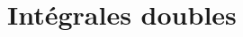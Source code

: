 \documentclass[11pt,a4paper]{article}
\newcommand{\RR}{\mathbb{R}}
\newcounter{exercice}
\def\exo#1{\vspace{.2cm}\textbf{Exercice\addtocounter{exercice}{1}
		\arabic{exercice} {\it #1}} }
\begin{document}
\newpage \section{Intégrales doubles }

	
	
		
\end{document}
